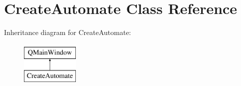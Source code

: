 \hypertarget{class_create_automate}{\section{Create\-Automate Class Reference}
\label{class_create_automate}
}
Inheritance diagram for Create\-Automate\-:\begin{figure}[H]
\begin{center}
\leavevmode
\includegraphics[height=2.000000cm]{class_create_automate}
\end{center}
\end{figure}
